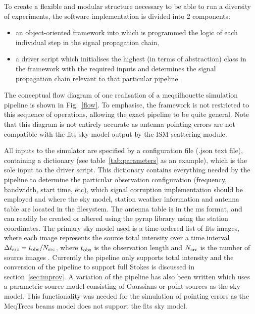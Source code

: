 To create a flexible and modular structure necessary to be able to run a diversity of experiments, the software implementation is divided into 2 components:
\begin{itemize}
 \item an object-oriented framework into which is programmed the logic of each individual step in the signal propagation chain,
 \item a driver script which initialises the highest (in terms of abstraction) class in the framework with the required inputs and determines the signal propagation chain relevant to that particular pipeline.
\end{itemize}
The conceptual flow diagram of one realisation of a {\sc meqsilhouette} simulation pipeline is shown in Fig.~\ref{flow}. To emphasise, the framework is not restricted to this sequence of operations, allowing the exact pipeline to be quite general. Note that this diagram is not entirely accurate as antenna pointing errors are not compatible with the {\sc fits} sky model output by the ISM scattering module.


All inputs to the simulator are specified by a configuration file (.json text file), containing a dictionary (see table~\ref{tab:parameters} as an example), which is the sole input to the driver script. This dictionary contains everything needed by the pipeline to determine the particular observation configuration (frequency, bandwidth, start time, etc), which signal corruption implementation should be employed and where the sky model, station weather information and antenna table are located in the filesystem. The antenna table is in the {\sc ms} format, and can readily be created or altered using the {\sc pyrap} library using the station coordinates. The primary sky model used is a time-ordered list of {\sc fits} images, where each image represents the source total intensity over a time interval $\Delta t_{\rm src} = t_{\rm obs}/N_{\rm src}$, where $t_{\rm obs}$ is the observation length and $N_{\rm src}$ is the number of source images \citep{Blecher_2016}. Currently the pipeline only supports total intensity and the conversion of the pipeline to support full Stokes is discussed in section~\ref{sec:improv}. A variation of the pipeline has also been written which uses a parametric source model consisting of Gaussians or point sources as the sky model. This functionality was needed for the simulation of pointing errors as the {\sc MeqTrees} beams model does not support the {\sc fits} sky model. 

